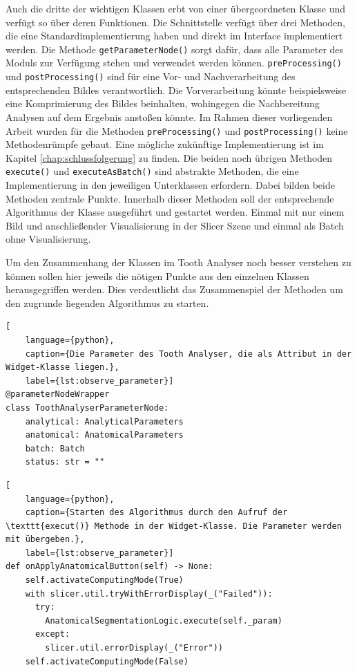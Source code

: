 Auch die dritte der wichtigen Klassen erbt von einer übergeordneten Klasse und
verfügt so über deren Funktionen. Die Schnittstelle verfügt über drei Methoden,
die eine Standardimplementierung haben und direkt im Interface implementiert
werden. Die Methode \texttt{getParameterNode()} sorgt dafür, dass alle Parameter
des Moduls zur Verfügung stehen und verwendet werden können. \texttt{preProcessing()}
und \texttt{postProcessing()} sind für eine Vor- und Nachverarbeitung des entsprechenden
Bildes verantwortlich. Die Vorverarbeitung könnte beispielsweise eine
Komprimierung des Bildes beinhalten, wohingegen die Nachbereitung Analysen auf dem
Ergebnis anstoßen könnte. Im Rahmen dieser vorliegenden Arbeit wurden für die
Methoden \texttt{preProcessing()} und \texttt{postProcessing()} keine
Methodenrümpfe gebaut. Eine mögliche zukünftige Implementierung ist im Kapitel \ref{chap:schlussfolgerung}
zu finden. Die beiden noch übrigen Methoden \texttt{execute()} und \texttt{executeAsBatch()}
sind abstrakte Methoden, die eine Implementierung in den jeweiligen Unterklassen
erfordern. Dabei bilden beide Methoden zentrale Punkte. Innerhalb dieser Methoden
soll der entsprechende Algorithmus der Klasse ausgeführt und gestartet werden.
Einmal mit nur einem Bild und anschließender Visualisierung in der Slicer Szene
und einmal als Batch ohne Visualisierung.

\pagebreak

Um den Zusammenhang der Klassen im Tooth Analyser noch besser verstehen zu können
sollen hier jeweils die nötigen Punkte aus den einzelnen Klassen herausgegriffen
werden. Dies verdeutlicht das Zusammenspiel der Methoden um den zugrunde
liegenden Algorithmus zu starten.

\begin{lstlisting}[
    language={python},
    caption={Die Parameter des Tooth Analyser, die als Attribut in der Widget-Klasse liegen.},
    label={lst:observe_parameter}]
@parameterNodeWrapper
class ToothAnalyserParameterNode:
    analytical: AnalyticalParameters
    anatomical: AnatomicalParameters
    batch: Batch
    status: str = ""
\end{lstlisting}

\begin{lstlisting}[
    language={python},
    caption={Starten des Algorithmus durch den Aufruf der \texttt{execut()} Methode in der Widget-Klasse. Die Parameter werden mit übergeben.},
    label={lst:observe_parameter}]
def onApplyAnatomicalButton(self) -> None:
    self.activateComputingMode(True)
    with slicer.util.tryWithErrorDisplay(_("Failed")):
	  try:
	    AnatomicalSegmentationLogic.execute(self._param)
	  except:
	    slicer.util.errorDisplay(_("Error"))
    self.activateComputingMode(False)
\end{lstlisting}

